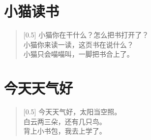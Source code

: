 \documentclass[12pt,UTF-8,openany]{ctexbook}
\begin{document}
\hanzibox{}\hanzibox{}\hanzibox{}\hanzibox{}\hspace{1em}\hanzibox{}\hanzibox{}\hanzibox{}\hanzibox{}

\hanzibox{}\hanzibox{}\hanzibox{}\hanzibox{}\hspace{1em}




\chapter{小猫读书}

\begin{large}
    
    \begin{verse}[0.5\linewidth]
        小猫你在干什么？怎么把书打开了？ \\
        小猫你来读一读，这页书在说什么？ \\
        小猫只会喵喵叫，一脚把书合上了。
    \end{verse}
    
\end{large}


\clearpage

\begin{center}
    
\end{center}


\hanzibox{}\hanzibox{}\hanzibox{}\hanzibox{}\hspace{1em}\hanzibox{}\hanzibox{}\hanzibox{}\hanzibox{}

\hanzibox{}\hanzibox{}\hanzibox{}\hanzibox{}\hspace{1em}\hanzibox{}\hanzibox{}\hanzibox{}\hanzibox{}

\hanzibox{}\hanzibox{}\hanzibox{}\hanzibox{}\hspace{1em}\hanzibox{}\hanzibox{}\hanzibox{}\hanzibox{}






\chapter{今天天气好}

\begin{large}
    
    \begin{verse}[0.5\linewidth]
        今天天气好，太阳当空照。 \\
        白云两三朵，还有几只鸟。 \\
        背上小书包，我去上学了。
    \end{verse}
    
\end{large}
\end{document}
